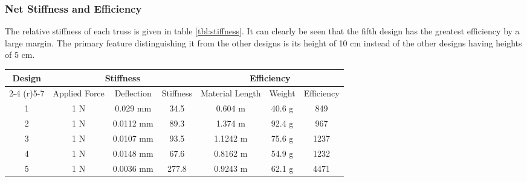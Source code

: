 \subsubsection{Net Stiffness and Efficiency}

The relative stiffness of each truss is given in table \ref{tbl:stiffness}.
It can clearly be seen that the fifth design has the greatest efficiency by a large margin.
The primary feature distinguishing it from the other designs is its height of 10 cm instead of the other designs having heights of 5 cm.

\begin{table*}[hp]
	\centering
	\caption{Stiffness and Efficiency}
	\label{tbl:stiffness}
	\vspace{6pt}
	\begin{tabular}{ccccccc}
		\toprule
		Design &  \multicolumn{3}{c}{Stiffness} & \multicolumn{3}{c}{Efficiency} \\
		\cmidrule(r){2-4}
		\cmidrule(r){5-7}
		 & Applied Force & Deflection & Stiffness & Material Length & Weight  & Efficiency \\
		\midrule
		1 & 1 N & 0.029 mm  & 34.5 & 0.604 m & 40.6 g & 849 \\
		2 & 1 N & 0.0112 mm & 89.3 & 1.374 m & 92.4 g & 967 \\
		3 & 1 N & 0.0107 mm & 93.5 & 1.1242 m & 75.6 g & 1237 \\
		4 & 1 N & 0.0148 mm & 67.6 & 0.8162 m & 54.9 g &  1232 \\
		5 & 1 N & 0.0036 mm & 277.8 & 0.9243 m & 62.1 g & 4471 \\
		\bottomrule
	\end{tabular}
\end{table*}

